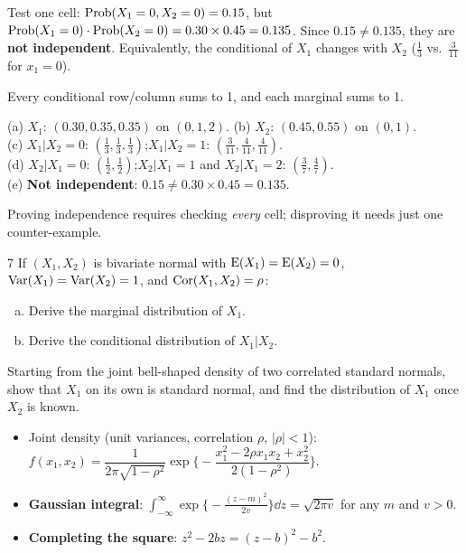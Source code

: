 \documentclass[11pt]{article}
\begin{document}
Test one cell: $\mathrm{Prob}(X_1=0,X_2=0)=0.15$, but $\mathrm{Prob}(X_1=0)\cdot\mathrm{Prob}(X_2=0)=0.30\times0.45=0.135$. Since $0.15\neq0.135$, they are \textbf{not independent}. Equivalently, the conditional of $X_1$ changes with $X_2$ ($\frac13$ vs.\ $\frac3{11}$ for $x_1=0$).

\begin{sanity}
Every conditional row/column sums to 1, and each marginal sums to 1. \checkmark
\end{sanity}

\begin{answer}
(a) $X_1$: $(0.30, 0.35, 0.35)$ on $(0,1,2)$. \quad (b) $X_2$: $(0.45, 0.55)$ on $(0,1)$.\\
(c) $X_1|X_2=0$: $(\frac13,\frac13,\frac13)$;\quad $X_1|X_2=1$: $(\frac3{11},\frac4{11},\frac4{11})$.\\
(d) $X_2|X_1=0$: $(\frac12,\frac12)$;\quad $X_2|X_1=1$ and $X_2|X_1=2$: $(\frac37,\frac47)$.\\
(e) \textbf{Not independent}: $0.15\neq0.30\times0.45=0.135$.
\end{answer}

\begin{takeaway}
Proving independence requires checking \emph{every} cell; disproving it needs just one counter-example.
\end{takeaway}


\begin{problem}{7}
If $(X_1,X_2)$ is bivariate normal with $\mathrm{E}(X_1)=\mathrm{E}(X_2)=0$, $\mathrm{Var}(X_1)=\mathrm{Var}(X_2)=1$, and $\mathrm{Cor}(X_1,X_2)=\rho$:
\begin{enumerate}[(a)]
\item Derive the marginal distribution of $X_1$.
\item Derive the conditional distribution of $X_1|X_2$.
\end{enumerate}
\end{problem}

\begin{restate}
Starting from the joint bell-shaped density of two correlated standard normals, show that $X_1$ on its own is standard normal, and find the distribution of $X_1$ once $X_2$ is known.
\end{restate}

\begin{recall}
\begin{itemize}
\item Joint density (unit variances, correlation $\rho$, $|\rho|<1$):
$f(x_1,x_2)=\dfrac{1}{2\pi\sqrt{1-\rho^2}}\exp\Big\{-\dfrac{x_1^2-2\rho x_1x_2+x_2^2}{2(1-\rho^2)}\Big\}$.
\item \textbf{Gaussian integral}: $\displaystyle\int_{-\infty}^\infty\exp\Big\{-\frac{(z-m)^2}{2v}\Big\}\dd z=\sqrt{2\pi v}$ for any $m$ and $v>0$.
\item \textbf{Completing the square}: $z^2-2bz=(z-b)^2-b^2$.
\end{itemize}
\end{recall}
\end{document}
